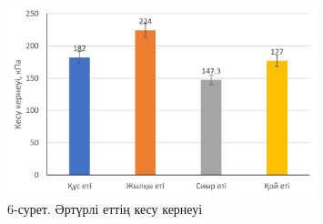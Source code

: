 \begin{figure}[H]
	\centering
	\includegraphics[width=0.8\textwidth]{media/pish/image9}
	\caption*{6-сурет. Әртүрлі еттің кесу кернеуі}
\end{figure}

